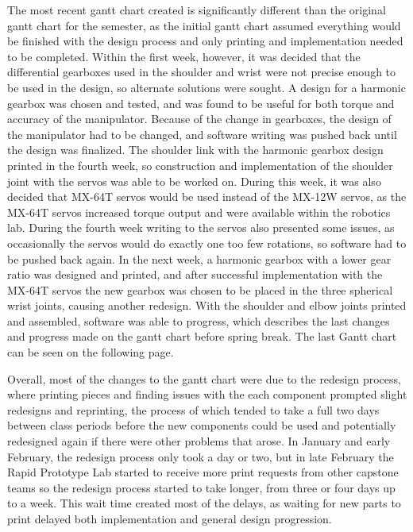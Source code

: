 The most recent gantt chart created is significantly different than the original gantt chart for the semester, as the initial gantt chart assumed everything would be finished with the design process and only printing and implementation needed to be completed. Within the first week, however, it was decided that the differential gearboxes used in the shoulder and wrist were not precise enough to be used in the design, so alternate solutions were sought. A design for a harmonic gearbox was chosen and tested, and was found to be useful for both torque and accuracy of the manipulator. Because of the change in gearboxes, the design of the manipulator had to be changed, and software writing was pushed back until the design was finalized. The shoulder link with the harmonic gearbox design printed in the fourth week, so construction and implementation of the shoulder joint with the servos was able to be worked on. During this week, it was also decided that MX-64T servos would be used instead of the MX-12W servos, as the MX-64T servos increased torque output and were available within the robotics lab. During the fourth week writing to the servos also presented some issues, as occasionally the servos would do exactly one too few rotations, so software had to be pushed back again. In the next week, a harmonic gearbox with a lower gear ratio was designed and printed, and after successful implementation with the MX-64T servos the new gearbox was chosen to be placed in the three spherical wrist joints, causing another redesign. With the shoulder and elbow joints printed and assembled, software was able to progress, which describes the last changes and progress made on the gantt chart before spring break. The last Gantt chart can be seen on the following page.

Overall, most of the changes to the gantt chart were due to the redesign process, where printing pieces and finding issues with the each component prompted slight redesigns and reprinting, the process of which tended to take a full two days between class periods before the new components could be used and potentially redesigned again if there were other problems that arose. In January and early February, the redesign process only took a day or two, but in late February the Rapid Prototype Lab started to receive more print requests from other capstone teams so the redesign process started to take longer, from three or four days up to a week. This wait time created most of the delays, as waiting for new parts to print delayed both implementation and general design progression.

